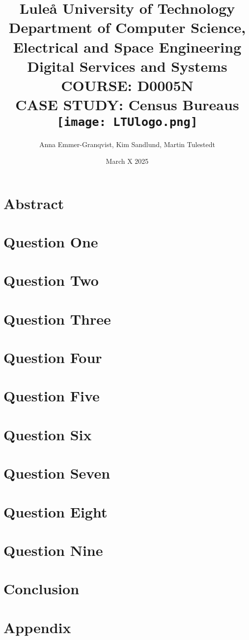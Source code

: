 \documentclass[12pt,a4paper]{report}
\title{
    {\large Luleå University of Technology}\\
    {\large Department of Computer Science, Electrical and Space Engineering}\\
    {\large Digital Services and Systems}\\
    {\large COURSE: D0005N}\\
    {CASE STUDY: Census Bureaus}\\
    {\centering\texttt{[image: LTUlogo.png]}}\\
}
\author{Anna Emmer-Granqvist, Kim Sandlund, Martin Tulestedt}
\date{March X 2025}
\begin{document}
\maketitle

\chapter*{Abstract}



\tableofcontents

\chapter{Question One}

\label{sec:question1}

\chapter{Question Two}
\label{sec:question2}


\chapter{Question Three}
\label{sec:question3}


\chapter{Question Four}
\label{sec:question4}


\chapter{Question Five}
\label{sec:question5}


\chapter{Question Six}
\label{sec:question6}


\chapter{Question Seven}
\label{sec:question7}


\chapter{Question Eight}
\label{sec:question8}


\chapter{Question Nine}
\label{sec:question9}


\chapter{Conclusion}
\label{sec:conclusion}


\chapter{Appendix}
\label{sec:appendix}


\printbibliography
\end{document}

